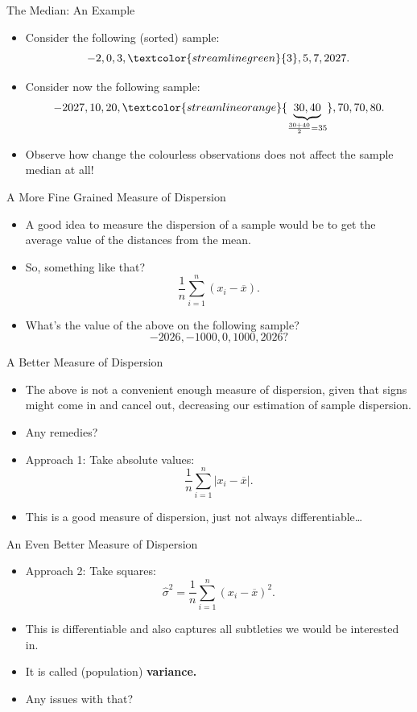 \documentclass[aspectratio=169, 12pt, xcolor=table]{beamer}
\newcommand{\abs}[1]{{\left|{#1}\right|}}
\begin{document}
	\begin{frame}{The Median: An Example}
		\begin{itemize}
			\item Consider the following (sorted) sample:
			\[-2, 0, 3, \textcolor{streamlinegreen}{3}, 5, 7, 2027.\]\pause
			\item Consider now the following sample:
			\[-2027, 10, 20, \textcolor{streamlineorange}{\underbrace{30, 40}_{\frac{30+40}{2}=35}}, 70, 70, 80.\]\pause
			\item Observe how change the colourless observations does not affect the sample median at all!
		\end{itemize}
	\end{frame}
	
	\begin{frame}{A More Fine Grained Measure of Dispersion}
		\begin{itemize}
			\item A good idea to measure the dispersion of a sample would be to get the average value of the distances from the mean.\pause
			\item So, something like that?
			\[\frac{1}{n}\sum_{i=1}^n(x_i-\overline{x}).\]\pause
			\item What's the value of the above on the following sample?
			\[-2026, -1000, 0, 1000, 2026?\]
		\end{itemize}
	\end{frame}

	\begin{frame}{A Better Measure of Dispersion}
		\begin{itemize}
			\item The above is not a convenient enough measure of dispersion, given that signs might come in and cancel out, decreasing our estimation of sample dispersion.
			\item Any remedies?\pause
			\item Approach 1: Take absolute values:
			\[\frac{1}{n}\sum_{i=1}^n\abs{x_i-\overline{x}}.\]\pause
			\item This is a good measure of dispersion, just not always differentiable\ldots
		\end{itemize}
	\end{frame}

	\begin{frame}{An Even Better Measure of Dispersion}
		\begin{itemize}
			\item Approach 2: Take squares:
			\[\hat{\sigma}^2=\frac{1}{n}\sum_{i=1}^n(x_i-\overline{x})^2.\]\pause
			\item This is differentiable and also captures all subtleties we would be interested in.
			\item It is called (population) \textbf{variance.}\pause
			\item Any issues with that?
		\end{itemize}
	\end{frame}
\end{document}
